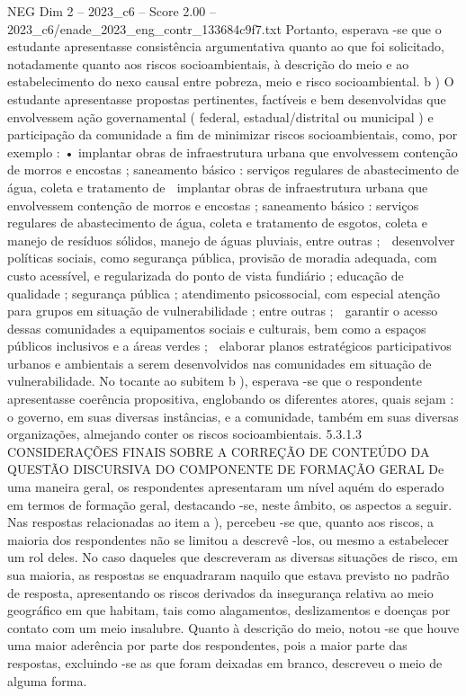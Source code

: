 \begin{textsample}{NEG Dim 2 – 2023\_c6 – Score 2.00 – 2023\_c6/enade\_2023\_eng\_contr\_133684c9f7.txt}
Portanto, esperava -se que o estudante apresentasse consistência argumentativa quanto ao que foi solicitado, notadamente quanto aos riscos socioambientais, à descrição do meio e ao estabelecimento do nexo causal entre pobreza, meio e risco socioambiental. b ) O estudante apresentasse propostas pertinentes, factíveis e bem desenvolvidas que envolvessem ação governamental ( federal, estadual/distrital ou municipal ) e participação da comunidade a fim de minimizar riscos socioambientais, como, por exemplo : • implantar obras de infraestrutura urbana que envolvessem contenção de morros e encostas ; saneamento básico : serviços regulares de abastecimento de água, coleta e tratamento de  implantar obras de infraestrutura urbana que envolvessem contenção de morros e encostas ; saneamento básico : serviços regulares de abastecimento de água, coleta e tratamento de esgotos, coleta e manejo de resíduos sólidos, manejo de águas pluviais, entre outras ;  desenvolver políticas sociais, como segurança pública, provisão de moradia adequada, com custo acessível, e regularizada do ponto de vista fundiário ; educação de qualidade ; segurança pública ; atendimento psicossocial, com especial atenção para grupos em situação de vulnerabilidade ; entre outras ;  garantir o acesso dessas comunidades a equipamentos sociais e culturais, bem como a espaços públicos inclusivos e a áreas verdes ;  elaborar planos estratégicos participativos urbanos e ambientais a serem desenvolvidos nas comunidades em situação de vulnerabilidade.
No tocante ao subitem b ), esperava -se que o respondente apresentasse coerência propositiva, englobando os diferentes atores, quais sejam : o governo, em suas diversas instâncias, e a comunidade, também em suas diversas organizações, almejando conter os riscos socioambientais. 5.3.1.3 CONSIDERAÇÕES FINAIS SOBRE A CORREÇÃO DE CONTEÚDO DA QUESTÃO DISCURSIVA DO COMPONENTE DE FORMAÇÃO GERAL De uma maneira geral, os respondentes apresentaram um nível aquém do esperado em termos de formação geral, destacando -se, neste âmbito, os aspectos a seguir.
Nas respostas relacionadas ao item a ), percebeu -se que, quanto aos riscos, a maioria dos respondentes não se limitou a descrevê -los, ou mesmo a estabelecer um rol deles.
No caso daqueles que descreveram as diversas situações de risco, em sua maioria, as respostas se enquadraram naquilo que estava previsto no padrão de resposta, apresentando os riscos derivados da insegurança relativa ao meio geográfico em que habitam, tais como alagamentos, deslizamentos e doenças por contato com um meio insalubre.
Quanto à descrição do meio, notou -se que houve uma maior aderência por parte dos respondentes, pois a maior parte das respostas, excluindo -se as que foram deixadas em branco, descreveu o meio de alguma forma.

\end{textsample}
